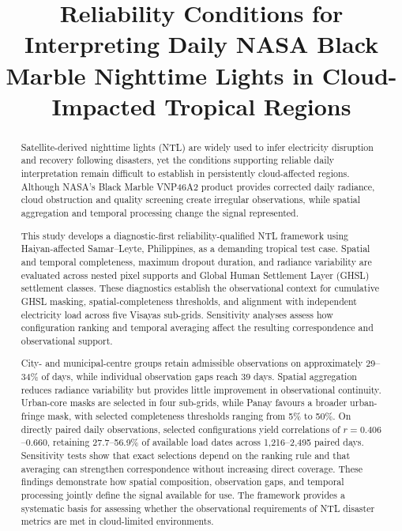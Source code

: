 \documentclass[]{interact}
\theoremstyle{plain}%
\theoremstyle{definition}
\theoremstyle{remark}
\begin{document}

\title{Reliability Conditions for Interpreting Daily NASA Black Marble
Nighttime Lights in Cloud-Impacted Tropical Regions}

\author{
}

\maketitle

\begin{abstract}
Satellite-derived nighttime lights (NTL) are widely used to infer electricity disruption and recovery following disasters, yet the conditions supporting reliable daily interpretation remain difficult to establish in persistently cloud-affected regions. Although NASA's Black Marble VNP46A2 product provides corrected daily radiance, cloud obstruction and quality screening create irregular observations, while spatial aggregation and temporal processing change the signal represented.

This study develops a diagnostic-first reliability-qualified NTL framework using Haiyan-affected Samar--Leyte, Philippines, as a demanding tropical test case. Spatial and temporal completeness, maximum dropout duration, and radiance variability are evaluated across nested pixel supports and Global Human Settlement Layer (GHSL) settlement classes. These diagnostics establish the observational context for cumulative GHSL masking, spatial-completeness thresholds, and alignment with independent electricity load across five Visayas sub-grids. Sensitivity analyses assess how configuration ranking and temporal averaging affect the resulting correspondence and observational support.

City- and municipal-centre groups retain admissible observations on approximately 29--34\% of days, while individual observation gaps reach 39 days. Spatial aggregation reduces radiance variability but provides little improvement in observational continuity. Urban-core masks are selected in four sub-grids, while Panay favours a broader urban-fringe mask, with selected completeness thresholds ranging from 5\% to 50\%. On directly paired daily observations, selected configurations yield correlations of $r=0.406$--$0.660$, retaining 27.7--56.9\% of available load dates across 1,216--2,495 paired days. Sensitivity tests show that exact selections depend on the ranking rule and that averaging can strengthen correspondence without increasing direct coverage. These findings demonstrate how spatial composition, observation gaps, and temporal processing jointly define the signal available for use. The framework provides a systematic basis for assessing whether the observational requirements of NTL disaster metrics are met in cloud-limited environments.
\end{abstract}
\end{document}
